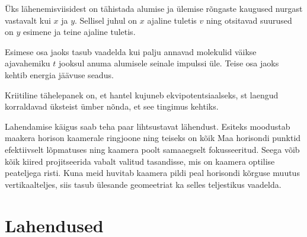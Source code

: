 \documentclass[10pt]{article}
\begin{document}

\hint

\probend
\bigskip


\hint
Üks lähenemisviisidest on tähistada alumise ja ülemise rõngaste kaugused nurgast vastavalt kui $x$ ja $y$. Sellisel juhul on $x$ ajaline tuletis $v$ ning otsitavad suurused on $y$ esimene ja teine ajaline tuletis.
\probend
\bigskip


\hint
Esimese osa jaoks tasub vaadelda kui palju annavad molekulid väikse ajavahemiku $t$ jooksul anuma alumisele seinale impulssi üle. Teise osa jaoks kehtib energia jäävuse seadus.
\probend
\bigskip


\hint
Kriitiline tähelepanek on, et hantel kujuneb ekvipotentsiaalseks, st laengud korraldavad üksteist ümber nõnda, et see tingimus kehtiks.
\probend
\bigskip


\hint
Lahendamise käigus saab teha paar lihtsustavat lähendust. Esiteks moodustab maakera horison kaamerale ringjoone ning teiseks on kõik Maa horisondi punktid efektiivselt lõpmatuses ning kaamera poolt samaaegselt fokusseeritud. Seega võib kõik kiired projitseerida vabalt valitud tasandisse, mis on kaamera optilise peateljega risti. Kuna meid huvitab kaamera pildi peal horisondi kõrguse muutus vertikaalteljes, siis tasub ülesande geomeetriat ka selles teljestikus vaadelda.
\probend
\bigskip
\newpage\section{Lahendused}
        \toggleSolution
        
\end{document}
